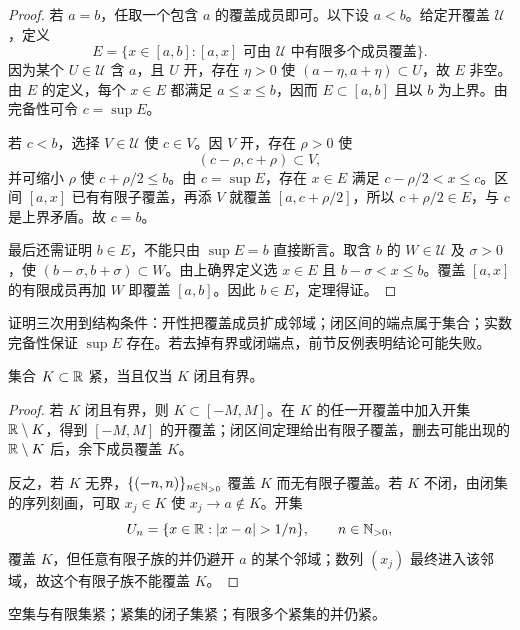 \begin{proof}
若 \(a=b\)，任取一个包含 \(a\) 的覆盖成员即可。以下设 \(a<b\)。给定开覆盖 \(\mathcal U\)，定义
\[
 E=\{x\in[a,b]:[a,x]\text{ 可由 }\mathcal U
 \text{ 中有限多个成员覆盖}\}.
\]
因为某个 \(U\in\mathcal U\) 含 \(a\)，且 \(U\) 开，存在 \(\eta>0\) 使
\((a-\eta,a+\eta)\subset U\)，故 \(E\) 非空。由 \(E\) 的定义，每个 \(x\in E\) 都满足 \(a\le x\le b\)，因而 \(E\subset[a,b]\) 且以 \(b\) 为上界。由完备性可令 \(c=\sup E\)。

若 \(c<b\)，选择 \(V\in\mathcal U\) 使 \(c\in V\)。因 \(V\) 开，存在 \(\rho>0\) 使
\[
 (c-\rho,c+\rho)\subset V,
\]
并可缩小 \(\rho\) 使 \(c+\rho/2\le b\)。由 \(c=\sup E\)，存在 \(x\in E\) 满足 \(c-\rho/2<x\le c\)。区间 \([a,x]\) 已有有限子覆盖，再添 \(V\) 就覆盖 \([a,c+\rho/2]\)，所以 \(c+\rho/2\in E\)，与 \(c\) 是上界矛盾。故 \(c=b\)。

最后还需证明 \(b\in E\)，不能只由 \(\sup E=b\) 直接断言。取含 \(b\) 的 \(W\in\mathcal U\) 及 \(\sigma>0\)，使 \((b-\sigma,b+\sigma)\subset W\)。由上确界定义选 \(x\in E\) 且 \(b-\sigma<x\le b\)。覆盖 \([a,x]\) 的有限成员再加 \(W\) 即覆盖 \([a,b]\)。因此 \(b\in E\)，定理得证。
\end{proof}

\begin{remark}
证明三次用到结构条件：开性把覆盖成员扩成邻域；闭区间的端点属于集合；实数完备性保证 \(\sup E\) 存在。若去掉有界或闭端点，前节反例表明结论可能失败。
\end{remark}

\begin{theorem}
集合 \(K\subset\mathbb{R}\) 紧，当且仅当 \(K\) 闭且有界。
\end{theorem}

\begin{proof}
若 \(K\) 闭且有界，则 \(K\subset[-M,M]\)。在 \(K\) 的任一开覆盖中加入开集 \(\mathbb{R}\setminus K\)，得到 \([-M,M]\) 的开覆盖；闭区间定理给出有限子覆盖，删去可能出现的 \(\mathbb{R}\setminus K\) 后，余下成员覆盖 \(K\)。

反之，若 \(K\) 无界，\(\{(-n,n)\}_{n\in\mathbb{N}_{>0}}\) 覆盖 \(K\) 而无有限子覆盖。若 \(K\) 不闭，由闭集的序列刻画，可取 \(x_j\in K\) 使 \(x_j\to a\notin K\)。开集
\[
 U_n=\{x\in\R:\abs{x-a}>1/n\},\qquad n\in\Npos,
\]
覆盖 \(K\)，但任意有限子族的并仍避开 \(a\) 的某个邻域；数列 \((x_j)\) 最终进入该邻域，故这个有限子族不能覆盖 \(K\)。
\end{proof}

\begin{proposition}[紧集的基本运算]
空集与有限集紧；紧集的闭子集紧；有限多个紧集的并仍紧。
\end{proposition}

